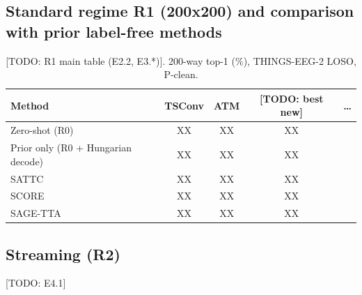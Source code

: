 \documentclass[10pt,twocolumn,letterpaper]{article}
\newcommand{\todo}[1]{{\color{red}[TODO: #1]}}
\newcommand{\XX}{{\color{red}XX}}
\begin{document}
\subsection{Standard regime R1 (200x200) and comparison with prior label-free methods}
\begin{table}[t]\centering\small
\caption{\todo{R1 main table (E2.2, E3.*)}. 200-way top-1 (\%), THINGS-EEG-2 LOSO, P-clean.}
\begin{tabular}{lcccc}\toprule
Method & TSConv & ATM & \todo{best new} & \dots\\\midrule
Zero-shot (R0) & \XX & \XX & \XX & \\
Prior only (R0 + Hungarian decode) & \XX & \XX & \XX & \\
SATTC & \XX & \XX & \XX & \\
SCORE & \XX & \XX & \XX & \\
SAGE-TTA & \XX & \XX & \XX & \\\bottomrule
\end{tabular}\end{table}

\subsection{Streaming (R2)}
\todo{E4.1}
\end{document}
